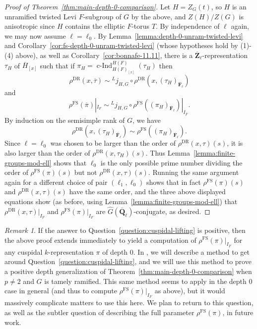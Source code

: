 \documentclass[reqno]{amsart}
\numberwithin{equation}{subsection}
\newcommand{\F}{\mathbf{F}}
\newcommand{\Q}{\mathbf{Q}}
\newcommand{\Z}{\mathbf{Z}}
\newcommand{\ol}[1]{\overline{#1}}
\newcommand{\wh}[1]{\widehat{#1}}
\newcommand{\ld}{{}^L}
\DeclareMathOperator{\FS}{FS}
\DeclareMathOperator{\cInd}{c-Ind}
\DeclareMathOperator{\DR}{DR}
\theoremstyle{remark}
\newtheorem{remark}[thm]{Remark}
\numberwithin{equation}{subsection}
\numberwithin{figure}{subsection}
\begin{document}
\begin{proof}[Proof of Theorem~\ref{thm:main-depth-0-comparison}]
    Let $H = Z_G(t)$, so $H$ is an unramified twisted Levi $F$-subgroup of $G$ by the above, and $Z(H)/Z(G)$ is anisotropic since $H$ contains the elliptic $F$-torus $T$. By independence of $\ell$ again, we may now assume $\ell = \ell_0$. By Lemma~\ref{lemma:depth-0-unram-twisted-levi} and Corollary~\ref{cor:fs-depth-0-unram-twisted-levi} (whose hypotheses hold by (1)-(4) above), as well as Corollary~\ref{cor:bonnafe-11.11}, there is a $\ol\Z_\ell$-representation $\tau_H$ of $\ol H_{[x]}$ such that if $\pi_H = \cInd_{H(F)_{[x]}}^{H(F)}(\tau_H)$ then
    \[
    \rho^{\DR}(x, \ol\tau) \sim \ld j_{H,G} \circ \rho^{\DR}(x, (\tau_H)_{\ol\F_\ell})
    \]
    and
    \[
    \rho^{\FS}(\ol\pi)|_{I_F} \sim \ld j_{H,G} \circ \rho^{\FS}((\pi_H)_{\ol\F_\ell})|_{I_F}.
    \]
    By induction on the semisimple rank of $G$, we have
    \[
    \rho^{\DR}(x, (\tau_H)_{\ol\F_\ell}) \sim \rho^{\FS}((\pi_H)_{\ol\F_\ell}).
    \]
    Since $\ell = \ell_0$ was chosen to be larger than the order of $\rho^{\DR}(x, \tau)(s)$, it is also larger than the order of $\rho^{\DR}(x, \tau_H)(s)$. Thus Lemma~\ref{lemma:finite-groups-mod-ell} shows that $\ell_0$ is the only possible prime number dividing the order of $\rho^{\FS}(\pi)(s)$ but not $\rho^{\DR}(x, \tau)(s)$. Running the same argument again for a different choice of pair $(\ell_1, \ell_0)$ shows that in fact $\rho^{\FS}(\pi)(s)$ and $\rho^{\DR}(x, \tau)(s)$ have the same order, and the three above displayed equations show (as before, using Lemma~\ref{lemma:finite-groups-mod-ell}) that $\rho^{\DR}(x, \tau)|_{I_F}$ and $\rho^{\FS}(\pi)|_{I_F}$ are $\wh G(\ol\Q_\ell)$-conjugate, as desired.
\end{proof}

\begin{remark}\label{rmk:singular-generalization}
    If the answer to Question~\ref{question:cuspidal-lifting} is positive, then the above proof extends immediately to yield a computation of $\rho^{\FS}(\pi)|_{I_F}$ for any cuspidal $k$-representation $\pi$ of depth $0$. In \cite{CF26b}, we will describe a method to get around Question~\ref{question:cuspidal-lifting}, and we will use this method to prove a positive depth generalization of Theorem~\ref{thm:main-depth-0-comparison} when $p \neq 2$ and $G$ is tamely ramified. This same method seems to apply in the depth $0$ case in general (and thus to compute $\rho^{\FS}(\pi)|_{I_F}$ as above), but it would massively complicate matters to use this here. We plan to return to this question, as well as the subtler question of describing the full parameter $\rho^{\FS}(\pi)$, in future work.
\end{remark}










\end{document}
